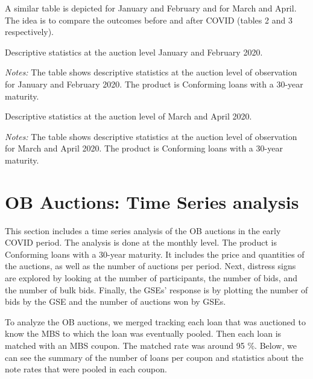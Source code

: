 \documentclass[11pt,a4paper]{article}
\begin{document}
A similar table is depicted for January and February and for March and April. The idea is to compare the outcomes before and after COVID (tables 2 and 3 respectively).

\begin{table}[h]
  \centering
  
  \caption{Descriptive statistics at the auction level January and February 2020. }
  \begin{minipage}{\textwidth}
      \footnotesize{\textit{Notes:} The table shows descriptive statistics at the auction level of observation for January and  February 2020. The product is Conforming loans with a 30-year maturity. } 
      \end{minipage}
\end{table}

\begin{table}[h]
  \centering
  
  \caption{Descriptive statistics at the auction level of March and April 2020. }
  \begin{minipage}{\textwidth}
      \footnotesize{\textit{Notes:} The table shows descriptive statistics at the auction level of observation for March and April 2020. The product is Conforming loans with a 30-year maturity. } 
      \end{minipage}
\end{table}

\pagebreak
\section{OB Auctions: Time Series analysis}

This section includes a time series analysis of the OB auctions in the early COVID period. The analysis is done at the monthly level. The product is Conforming loans with a 30-year maturity. It includes the price and quantities of the auctions, as well as the number of auctions per period. Next, distress signs are explored by looking at the number of participants, the number of bids, and the number of bulk bids. Finally, the GSEs' response is by plotting the number of bids by the GSE and the number of auctions won by GSEs.

To analyze the OB auctions, we merged tracking each loan that was auctioned to know the MBS to which the loan was eventually pooled. Then each loan is matched with an MBS coupon. The matched rate was around 95 \%. Below, we can see the summary of the number of loans per coupon and statistics about the note rates that were pooled in each coupon. 
\end{document}
